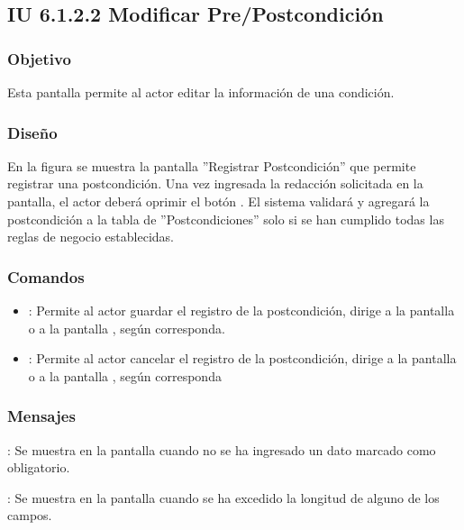 \subsection{IU 6.1.2.2 Modificar Pre/Postcondición}

\subsubsection{Objetivo}
	Esta pantalla permite al actor editar la información de una condición.
\subsubsection{Diseño}
	En la figura  se muestra la pantalla ''Registrar Postcondición'' que permite registrar una postcondición. Una vez ingresada la redacción solicitada en la pantalla, el actor deberá oprimir el botón  . El sistema validará y agregará la postcondición a la tabla de ''Postcondiciones'' solo si se han cumplido todas las reglas de negocio establecidas.

\subsubsection{Comandos}
\begin{itemize}
	\item {}: Permite al actor guardar el registro de la postcondición, dirige a la pantalla  o a la pantalla , según corresponda.
	\item {}: Permite al actor cancelar el registro de la postcondición, dirige a la pantalla  o a la pantalla , según corresponda
\end{itemize}

\subsubsection{Mensajes}

\begin{Citemize}
	\item {}: Se muestra en la pantalla  cuando no se ha ingresado un dato marcado como obligatorio.
	\item {}: Se muestra en la pantalla  cuando se ha excedido la longitud de alguno de los campos.
\end{Citemize}
